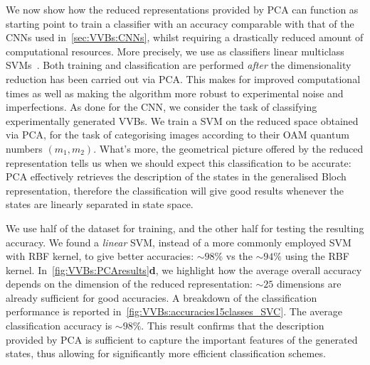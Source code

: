 We now show how the reduced representations provided by \ac{PCA} can function as starting point to train a classifier with an accuracy comparable with that of the \acp{CNN} used in~\cref{sec:VVBs:CNNs}, whilst requiring a drastically reduced amount of computational resources.
More precisely, we use as classifiers linear multiclass \acp{SVM}~\cite{hearst1998support,shawe2000support}.
Both training and classification are performed \emph{after} the dimensionality reduction has been carried out via \ac{PCA}. This makes for improved computational times as well as making the algorithm more robust to experimental noise and imperfections.
As done for the \ac{CNN}, we consider the task of classifying experimentally generated VVBs. We train a \ac{SVM} on the reduced space obtained via \ac{PCA}, for the task of categorising images according to their OAM quantum numbers $(m_1,m_2)$.
What's more, the geometrical picture offered by the reduced representation tells us when we should expect this classification to be accurate: \ac{PCA} effectively retrieves the description of the states in the generalised Bloch representation, therefore the classification will give good results whenever the states are linearly separated in state space.

We use half of the dataset for training, and the other half for testing the resulting accuracy.
We found a \emph{linear} SVM, instead of a more commonly employed SVM with RBF kernel, to give better accuracies: $\sim98\%$ vs the $\sim94\%$ using the RBF kernel.
In~\cref{fig:VVBs:PCAresults}\textbf{d}, we highlight how the average overall accuracy depends on the dimension of the reduced representation: $\sim 25$ dimensions are already sufficient for good accuracies.
A breakdown of the classification performance is reported in~\cref{fig:VVBs:accuracies15classes_SVC}.
The average classification accuracy is $\sim 98 \%$. This result confirms that the description provided by \ac{PCA} is sufficient to capture the important features of the generated states, thus allowing for significantly more efficient classification schemes.

